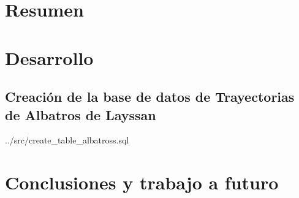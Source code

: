 \documentclass[a4paper, 11pt]{article}
\begin{document}
\section{Resumen}


\section{Desarrollo}

\subsection{Creación de la base de datos de Trayectorias de Albatros de Layssan}

 {../src/create_table_albatross.sql}

\section{Conclusiones y trabajo a futuro}


\end{document}

